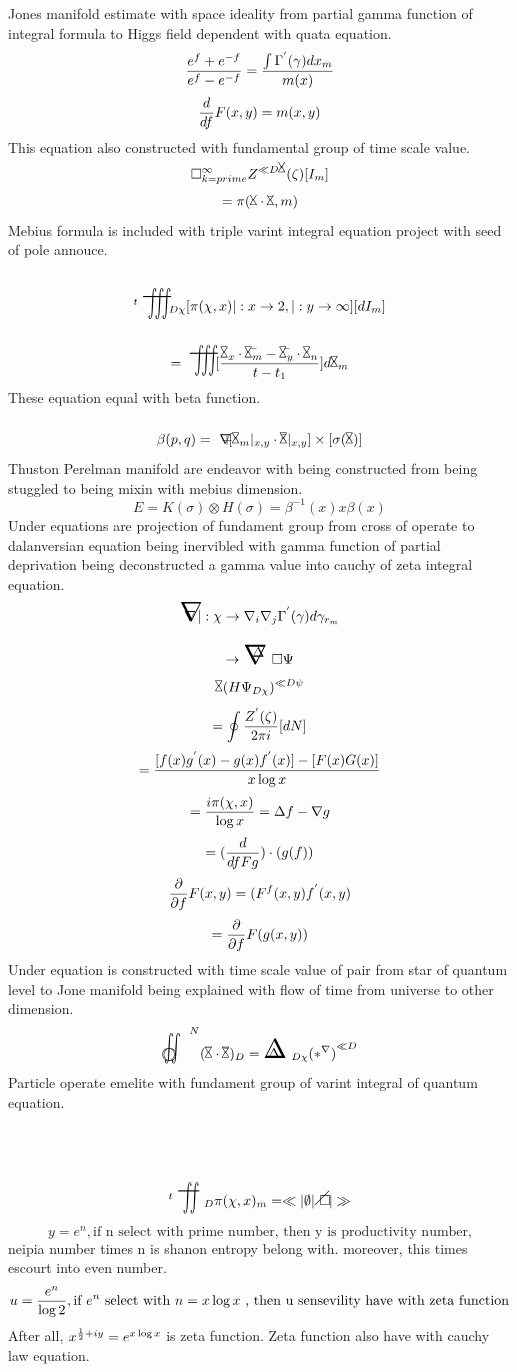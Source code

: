 \documentclass{jsarticle}
\begin{document}
  Jones manifold estimate with space ideality from partial gamma function
  of integral formula to Higgs field dependent with quata equation.
  $$ {{e^{f} + e^{-f}} \over {e^{f} - e^{-f}}} = {{\int \Gamma^{'}(\gamma)
  dx_m} \over {m(x)}} $$
  $$ {d \over {d f}}F(x,y) = m(x,y) $$
  This equation also constructed with fundamental group of time scale value.
  $$ \square_{k = prime}^{\infty} Z^{\ll D{\timebow}}(\zeta)[I_m] $$
  $$ = \pi(\timebow\cdot \bar{\timebow},m) $$
  Mebius formula is included with triple varint integral equation project 
  with seed of pole annouce.
  $$ {}^{t}\scalebox{1.0}[2]{\variiint}_{D\chi}[\pi(\chi,x) |: x \to
  2, |:y \to \infty][dI_m]$$
  $$ = \scalebox{1.0}[2]{\variiint}[{{{\timebow_{x}\cdot \bar{\timebow_m}}
  - {\bar{\timebow_y}\cdot \timebow_n}}\over {t - t_1}}]d\timebow_m $$
  These equation equal with beta function.
  $$ \beta(p,q) = \secproduct[\timebow_m|_{x,y} \cdot \bar{\timebow}|_{x,y}
  ]\times [\sigma(\timebow)] $$
  Thuston Perelman manifold are endeavor with being constructed from being
  stuggled to being mixin with mebius dimension.
  $$ E = K(\sigma) \otimes H(\sigma) = \beta^{-1}(x)x\beta(x) $$
  Under equations are projection of fundament group from cross of operate to
  dalanversian equation being inervibled with gamma function of partial
  deprivation being deconstructed a gamma value into cauchy of zeta integral
  equation.
  $$ \innabla |:\chi \to \nabla_{i}\nabla_{j}\Gamma^{'}(\gamma)d\gamma_{r_m} $$
  $$ \to \starnabla \square \Psi $$
  $$ \timebow(H\Psi_{D\chi})^{\ll D\psi} $$
  $$ = \oint {{Z^{'}(\zeta)} \over {2\pi i}}[dN] $$
  $$ ={{[f(x)g^{'}(x) - g(x)f^{'}(x)] - [F(x)G(x)]} \over {x \log x}} $$
  $$ = {{i\pi(\chi,x)} \over {\log x}} = \Delta f - \nabla g $$
  $$ = ({d \over {d f}Fg})\cdot (g(f)) $$
  $$ {\partial \over {\partial f}}F(x,y) = (F^{f}(x,y)f^{'}(x,y) $$
  $$ = {\partial \over {\partial f}}F(g(x,y)) $$ 
  Under equation is constructed with time scale value of pair from star of
  quantum level to Jone manifold being explained with flow of time from
  universe to other dimension.
  $$ \whitewithbodercircleiint^{N} (\timebow \cdot \bar{\timebow})_{D}
  = \inndelta_{D\chi}{(\ast^{\nabla})}^{\ll D}$$
  Particle operate emelite with fundament group of varint integral of
  quantum equation.
  $$ {}^{t}\scalebox{1.0}[2]{\variint}_{D} 
  \pi(\chi,x)_m = \ll |\emptyset | \alearletter| \gg $$

  $$ y = e^{n}, \text{if n select with prime number, then y is productivity 
  number,}$$ 
  neipia number times n is shanon entropy belong with.
  moreover, this times escourt into even number. 
  $$ u = {e^{n} \over {\log 2}}, \text{if $e^{n}$ select with $n = x \log x$ 
  , then u sensevility have with zeta function} $$
  After all, $ x^{{1 \over 2} + iy} = e^{x \log x} $ is zeta function.
  Zeta function also have with cauchy law equation.
\end{document}
